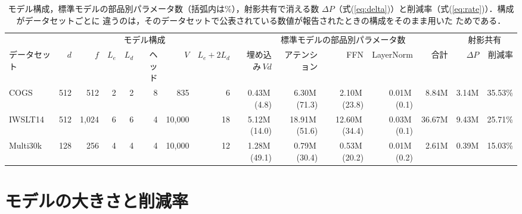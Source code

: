 \documentclass{nlp2026}
\begin{document}
\begin{table}[t]
  \centering
  \scriptsize
  \setlength{\tabcolsep}{3pt}
  \caption{モデル構成，標準モデルの部品別パラメータ数（括弧内は\%），射影共有で消える数
  $\Delta P$（式(\ref{eq:delta})）と削減率（式(\ref{eq:rate})）．構成がデータセットごとに
  違うのは，そのデータセットで公表されている数値が報告されたときの構成をそのまま用いた
  ためである．}
  \label{tab:config}
  \begin{tabular}{lrrrrrrr@{\hspace{7pt}}rrrrr@{\hspace{7pt}}rr}
    \toprule
    & \multicolumn{7}{c}{モデル構成} & \multicolumn{5}{c}{標準モデルの部品別パラメータ数}
      & \multicolumn{2}{c}{射影共有} \\
    \cmidrule(r){2-8}\cmidrule(lr){9-13}\cmidrule(l){14-15}
    データセット & $d$ & $f$ & $L_e$ & $L_d$ & ヘッド & $V$ & $L_e{+}2L_d$
      & 埋め込み$\,Vd$ & アテンション & FFN & LayerNorm & 合計
      & $\Delta P$ & 削減率 \\
    \midrule
    COGS     & 512 & 512     & 2 & 2 & 8 & 835      & 6
      & 0.43M\,(\phantom{0}4.8)  & \phantom{0}6.30M\,(71.3)  & \phantom{0}2.10M\,(23.8)
      & 0.01M\,(0.1) & \phantom{0}8.84M & 3.14M & 35.53\% \\
    IWSLT14  & 512 & 1{,}024 & 6 & 6 & 4 & 10{,}000 & 18
      & 5.12M\,(14.0) & 18.91M\,(51.6) & 12.60M\,(34.4)
      & 0.03M\,(0.1) & 36.67M & 9.43M & 25.71\% \\
    Multi30k & 128 & 256     & 4 & 4 & 4 & 10{,}000 & 12
      & 1.28M\,(49.1) & \phantom{0}0.79M\,(30.4)  & \phantom{0}0.53M\,(20.2)
      & 0.01M\,(0.2) & \phantom{0}2.61M & 0.39M & 15.03\% \\
    \bottomrule
  \end{tabular}
\end{table}

\section{モデルの大きさと削減率}
\label{sec:size}
\end{document}
